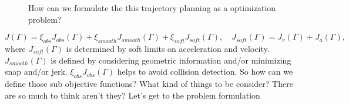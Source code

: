 \documentclass[12pt]{article}%
\begin{document}
\begin{figure}[H]%
    \centering
    \qquad
    \label{fig:example}\caption{How can we formulate the this trajectory planning as a optimization problem?} %
\end{figure}

\begin{equation}
     J(\Gamma) =  \xi_{obs}J_{obs}(\Gamma) + \xi_{smooth}J_{smooth}(\Gamma) + \xi_{soft}J_{soft}(\Gamma), \quad J_{soft}(\Gamma) = J_{v}(\Gamma) + J_{a}(\Gamma),
\end{equation} where $J_{soft}(\Gamma)$ is determined by soft limits on acceleration and velocity. $J_{smooth}(\Gamma)$ is defined by considering geometric information and/or minimizing snap and/or jerk. $\xi_{obs}J_{obs}(\Gamma)$ helps to avoid collision detection. So how can we define those sub objective functions? What kind of things to be consider? There are so much to think aren't they? Let's get to the problem formulation
\end{document}
